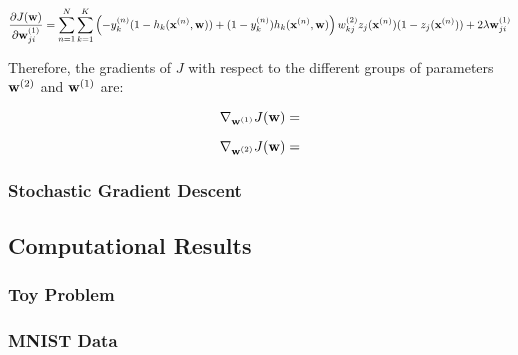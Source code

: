 \begin{equation}
\frac{\partial J(\boldsymbol{\mathbf{w}})}{\partial \boldsymbol{\mathbf{w}}^{(1)}_{ji}} = \sum_{n=1}^{N} \sum_{k=1}^{K} \left(-y_k^{(n)}(1 - h_k(\boldsymbol{\mathbf{x}}^{(n)},\boldsymbol{\mathbf{w}})) + (1-y_k^{(n)})h_k(\boldsymbol{\mathbf{x}}^{(n)},\boldsymbol{\mathbf{w}}) \right)w_{kj}^{(2)} z_j(\boldsymbol{\mathbf{x}}^{(n)})(1-z_j(\boldsymbol{\mathbf{x}}^{(n)}))+ 2 \lambda \boldsymbol{\mathbf{w}}^{(1)}_{ji}
\end{equation}

Therefore, the gradients of $J$ with respect to the different groups of parameters $\boldsymbol{\mathbf{w}}^{(2)}$ and $\boldsymbol{\mathbf{w}}^{(1)}$ are:

\begin{equation}
\nabla_{\boldsymbol{\mathbf{w}}^{(1)}} J(\boldsymbol{\mathbf{w}}) = 
\end{equation}

\begin{equation}
\nabla_{\boldsymbol{\mathbf{w}}^{(2)}} J(\boldsymbol{\mathbf{w}}) = 
\end{equation}

\subsubsection{Stochastic Gradient Descent}



\subsection{Computational Results}

\subsubsection{Toy Problem}

\subsubsection{MNIST Data}



